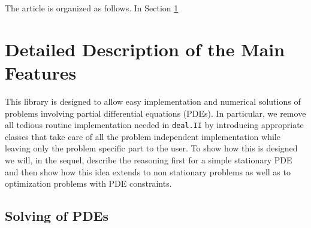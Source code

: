 \documentclass[prodmode,acmtoms]{acmsmall}
\numberwithin{equation}{section}
\newcommand{\deal}{\texttt{deal.II}}
\newcommand{\dope}{\texttt{DOpElib}}
\newcommand{\todo}[1]{\textbf{\textsc{\textcolor{black}{TODO: #1}}}}
\begin{document}
The article is organized as follows. In Section
\ref{detailed_description} 
 
%
%
%



\section{Detailed Description of the Main Features}
\label{detailed_description}
This library is designed to allow easy implementation and numerical solutions 
of problems involving partial differential equations (PDEs). 
In particular, we remove all tedious routine implementation needed in 
\deal{} by introducing appropriate classes that take care of all the 
problem independent implementation while leaving only the problem specific 
part to the user. To show how this is designed we will, in the sequel, 
describe the reasoning first for a simple stationary PDE and then show
how this idea extends to non stationary problems as well as to optimization
problems with PDE constraints. 

\subsection{Solving of PDEs}
\end{document}
